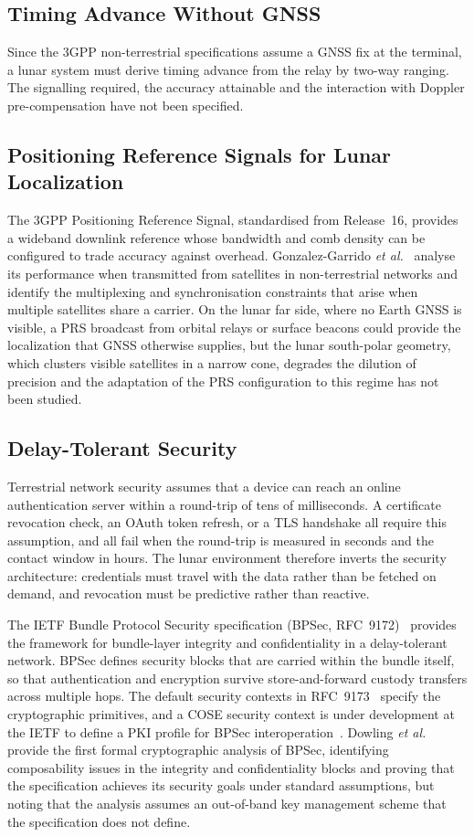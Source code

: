 \documentclass[11pt,a4paper]{article}
\begin{document}
\subsection{Timing Advance Without GNSS}
Since the 3GPP non-terrestrial specifications assume a GNSS fix at the terminal, a lunar system must derive timing advance from the relay by two-way ranging. The signalling required, the accuracy attainable and the interaction with Doppler pre-compensation have not been specified.

\subsection{Positioning Reference Signals for Lunar Localization}
The 3GPP Positioning Reference Signal, standardised from Release~16, provides a wideband downlink reference whose bandwidth and comb density can be configured to trade accuracy against overhead. Gonzalez-Garrido \emph{et al.}~\cite{prs_ntn_plans2023} analyse its performance when transmitted from satellites in non-terrestrial networks and identify the multiplexing and synchronisation constraints that arise when multiple satellites share a carrier. On the lunar far side, where no Earth GNSS is visible, a PRS broadcast from orbital relays or surface beacons could provide the localization that GNSS otherwise supplies, but the lunar south-polar geometry, which clusters visible satellites in a narrow cone, degrades the dilution of precision and the adaptation of the PRS configuration to this regime has not been studied.

\subsection{Delay-Tolerant Security}
Terrestrial network security assumes that a device can reach an online authentication server within a round-trip of tens of milliseconds. A certificate revocation check, an OAuth token refresh, or a TLS handshake all require this assumption, and all fail when the round-trip is measured in seconds and the contact window in hours. The lunar environment therefore inverts the security architecture: credentials must travel with the data rather than be fetched on demand, and revocation must be predictive rather than reactive.

The IETF Bundle Protocol Security specification (BPSec, RFC~9172)~\cite{rfc9172} provides the framework for bundle-layer integrity and confidentiality in a delay-tolerant network. BPSec defines security blocks that are carried within the bundle itself, so that authentication and encryption survive store-and-forward custody transfers across multiple hops. The default security contexts in RFC~9173~\cite{rfc9173} specify the cryptographic primitives, and a COSE security context is under development at the IETF to define a PKI profile for BPSec interoperation~\cite{bpsec_cose}. Dowling \emph{et al.}~\cite{dowling_bpsec} provide the first formal cryptographic analysis of BPSec, identifying composability issues in the integrity and confidentiality blocks and proving that the specification achieves its security goals under standard assumptions, but noting that the analysis assumes an out-of-band key management scheme that the specification does not define.
\end{document}
